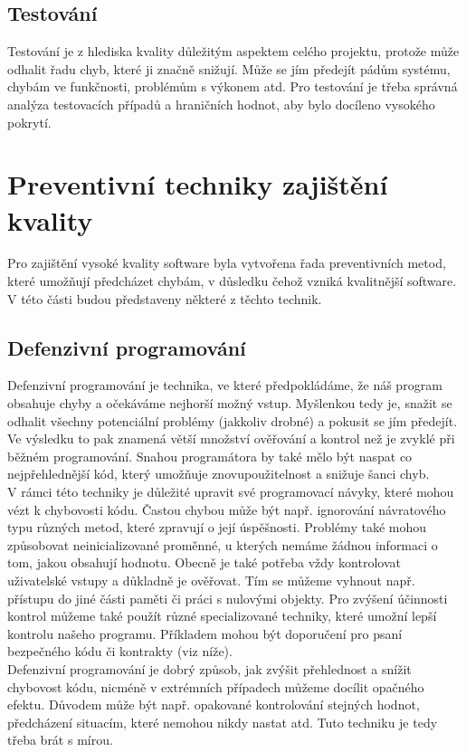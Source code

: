 	\subsection{Testování}
		Testování je z hlediska kvality důležitým aspektem celého projektu, protože může odhalit řadu chyb, které ji značně snižují. Může se jím předejít pádům systému, chybám ve funkčnosti, problémům s výkonem atd. Pro testování je třeba správná analýza testovacích případů a hraničních hodnot, aby bylo docíleno vysokého pokrytí.
	
	
\section{Preventivní techniky zajištění kvality}	
	Pro zajištění vysoké kvality software byla vytvořena řada preventivních metod, které umožňují předcházet chybám, v důsledku čehož vzniká kvalitnější software. V této části budou představeny některé z těchto technik.
		

	\subsection{Defenzivní programování}
		Defenzivní programování \cite{defProgram} je technika, ve které předpokládáme, že náš program obsahuje chyby a očekáváme nejhorší možný vstup. Myšlenkou tedy je, snažit se odhalit všechny potenciální problémy (jakkoliv drobné) a pokusit se jím předejít. Ve výsledku to pak znamená větší množství ověřování a kontrol než je zvyklé při běžném programování. Snahou programátora by také mělo být naspat co nejpřehlednější kód, který umožňuje znovupoužitelnost a snižuje šanci chyb.\\ 
		
		V rámci této techniky je důležité upravit své programovací návyky, které mohou vézt k chybovosti kódu. Častou chybou může být např. ignorování návratového typu různých metod, které zpravují o její úspěšnosti. Problémy také mohou způsobovat neinicializované proměnné, u kterých nemáme žádnou informaci o tom, jakou obsahují hodnotu. Obecně je také potřeba vždy kontrolovat uživatelské vstupy a důkladně je ověřovat. Tím se můžeme vyhnout např. přístupu do jiné části paměti či práci s nulovými objekty. Pro zvýšení účinnosti kontrol můžeme také použít různé specializované techniky, které umožní lepší kontrolu našeho programu. Příkladem mohou být doporučení pro psaní bezpečného kódu či kontrakty (viz níže).\\
		
		Defenzivní programování je dobrý způsob, jak zvýšit přehlednost a snížit chybovost kódu, nicméně v extrémních případech můžeme docílit opačného efektu. Důvodem může být např. opakované kontrolování stejných hodnot, předcházení situacím, které nemohou nikdy nastat atd. Tuto techniku je tedy třeba brát s mírou.
		
